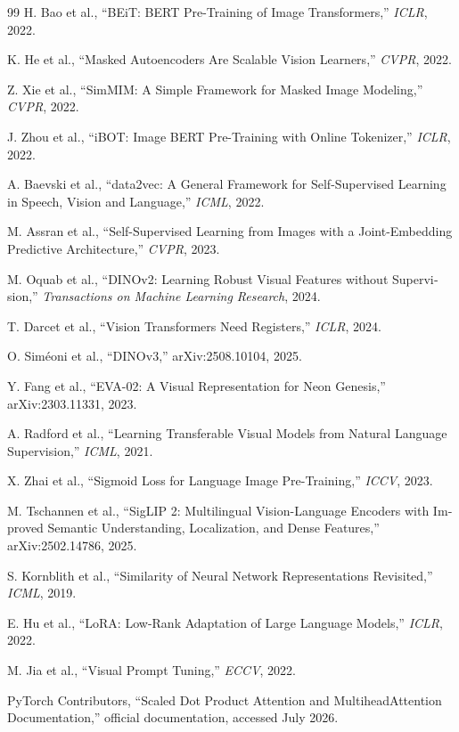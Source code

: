 \documentclass[12pt,openany,oneside]{book}
\begin{document}
\begin{latin}
\begin{thebibliography}{99}
H. Bao et al.,
``BEiT: BERT Pre-Training of Image Transformers,''
\emph{ICLR}, 2022.

K. He et al.,
``Masked Autoencoders Are Scalable Vision Learners,''
\emph{CVPR}, 2022.

Z. Xie et al.,
``SimMIM: A Simple Framework for Masked Image Modeling,''
\emph{CVPR}, 2022.

J. Zhou et al.,
``iBOT: Image BERT Pre-Training with Online Tokenizer,''
\emph{ICLR}, 2022.

A. Baevski et al.,
``data2vec: A General Framework for Self-Supervised Learning in Speech, Vision and Language,''
\emph{ICML}, 2022.

M. Assran et al.,
``Self-Supervised Learning from Images with a Joint-Embedding Predictive Architecture,''
\emph{CVPR}, 2023.

M. Oquab et al.,
``DINOv2: Learning Robust Visual Features without Supervision,''
\emph{Transactions on Machine Learning Research}, 2024.

T. Darcet et al.,
``Vision Transformers Need Registers,''
\emph{ICLR}, 2024.

O. Sim\'{e}oni et al.,
``DINOv3,''
arXiv:2508.10104, 2025.

Y. Fang et al.,
``EVA-02: A Visual Representation for Neon Genesis,''
arXiv:2303.11331, 2023.

A. Radford et al.,
``Learning Transferable Visual Models from Natural Language Supervision,''
\emph{ICML}, 2021.

X. Zhai et al.,
``Sigmoid Loss for Language Image Pre-Training,''
\emph{ICCV}, 2023.

M. Tschannen et al.,
``SigLIP 2: Multilingual Vision-Language Encoders with Improved Semantic Understanding, Localization, and Dense Features,''
arXiv:2502.14786, 2025.

S. Kornblith et al.,
``Similarity of Neural Network Representations Revisited,''
\emph{ICML}, 2019.

E. Hu et al.,
``LoRA: Low-Rank Adaptation of Large Language Models,''
\emph{ICLR}, 2022.

M. Jia et al.,
``Visual Prompt Tuning,''
\emph{ECCV}, 2022.

PyTorch Contributors,
``Scaled Dot Product Attention and MultiheadAttention Documentation,''
official documentation, accessed July 2026.


\end{thebibliography}
\end{latin}
\end{document}
